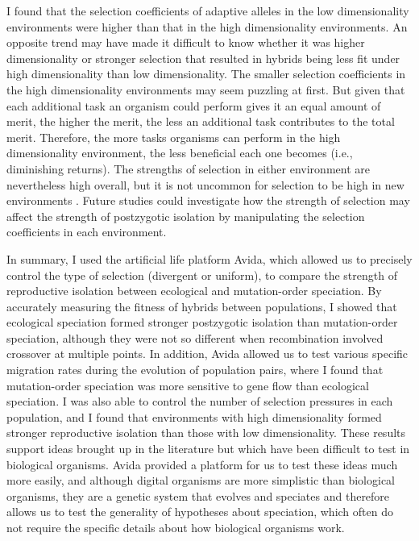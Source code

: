 \begin{doublespace}
I found that the selection coefficients of adaptive alleles
in the low dimensionality environments were higher
than that in the high dimensionality environments.
%
An opposite trend may have made it difficult to know whether
it was higher dimensionality or stronger selection that resulted
in hybrids being less fit under high dimensionality than low dimensionality.
%
The smaller selection coefficients in the high dimensionality environments
may seem puzzling at first.
%
But given that each additional task an organism could perform gives it
an equal amount of merit, the higher the merit, the less an additional task
contributes to the total merit.
%
Therefore, the more tasks organisms can perform in the high dimensionality
environment, the less beneficial each one becomes (i.e., diminishing returns).
%
The strengths of selection in either environment are nevertheless high overall,
but it is not uncommon for selection to be high in new environments
\citep[e.g.,][]{len91,det07}.
%
Future studies could investigate how the strength of selection may affect
the strength of postzygotic isolation
by manipulating the selection coefficients in each environment.



In summary, I used the artificial life platform Avida, which allowed us to
precisely control the type of selection (divergent or uniform), to compare the
strength of reproductive isolation between ecological and mutation-order
speciation.
%
By accurately measuring the fitness of hybrids between populations, I showed
that ecological speciation formed stronger postzygotic isolation than
mutation-order speciation, although they were not so different when
recombination involved crossover at multiple points.
%
In addition, Avida allowed us to test various specific migration rates during
the evolution of population pairs, where I found that mutation-order
speciation was more sensitive to gene flow than ecological speciation.
%
I was also able to control the number of selection pressures in each
population, and I found that environments with high dimensionality formed
stronger reproductive isolation than those with low dimensionality.
%
These results support ideas brought up in the literature but which have been
difficult to test in biological organisms.
%
Avida provided a platform for us to test these ideas much more easily, and
although digital organisms are more simplistic than biological organisms, they
are a genetic system that evolves and speciates and therefore allows us to test
the generality of hypotheses about speciation, which often do not require the
specific details about how biological organisms work.




\end{doublespace}
